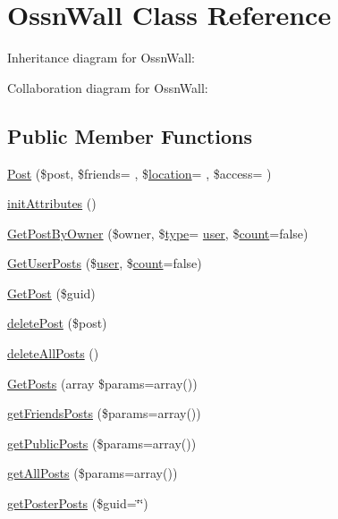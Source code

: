 \hypertarget{class_ossn_wall}{}\section{Ossn\+Wall Class Reference}
\label{class_ossn_wall}


Inheritance diagram for Ossn\+Wall\+:


Collaboration diagram for Ossn\+Wall\+:
\subsection*{Public Member Functions}
\begin{DoxyCompactItemize}
\item 
\hyperlink{class_ossn_wall_aeadb0aa3a5fb5b9d1425567c20942520}{Post} (\$post, \$friends= \textquotesingle{}\textquotesingle{}, \$\hyperlink{_chart_8_doughnut_8js_a761c752fb16f7c0bfe1026b787ca0032}{location}= \textquotesingle{}\textquotesingle{}, \$access= \textquotesingle{}\textquotesingle{})
\item 
\hyperlink{class_ossn_wall_a5fee6794de13185987b790fce43d0883}{init\+Attributes} ()
\item 
\hyperlink{class_ossn_wall_a9f17709243f74afc78d1ae713505d0b3}{Get\+Post\+By\+Owner} (\$owner, \$\hyperlink{_ossn_wall_2actions_2wall_2post_2group_8php_a2dc1bb4e1ed0029daa81ac0776b14b51}{type}= \textquotesingle{}\hyperlink{ossn_8config_8db_8example_8php_a802544b7ba9f79bbf24ef67773d53bed}{user}\textquotesingle{}, \$\hyperlink{photos_2pages_2photos_8php_a364678aa3bd05301b3d1b8650653cf48}{count}=false)
\item 
\hyperlink{class_ossn_wall_a84aad06cd5aff1e1f1001de94047d429}{Get\+User\+Posts} (\$\hyperlink{ossn_8config_8db_8example_8php_a802544b7ba9f79bbf24ef67773d53bed}{user}, \$\hyperlink{photos_2pages_2photos_8php_a364678aa3bd05301b3d1b8650653cf48}{count}=false)
\item 
\hyperlink{class_ossn_wall_a5058502978e1b2f0ed7b0de731092683}{Get\+Post} (\$guid)
\item 
\hyperlink{class_ossn_wall_a8f736af6fb63fc982d04aa10025517f2}{delete\+Post} (\$post)
\item 
\hyperlink{class_ossn_wall_af31442c809884a2acb25802f88dfed26}{delete\+All\+Posts} ()
\item 
\hyperlink{class_ossn_wall_a1dd557d1847bc067d0b91a62821fc8d2}{Get\+Posts} (array \$params=array())
\item 
\hyperlink{class_ossn_wall_a5a4de51f95bf3d107b00ea718ceed53e}{get\+Friends\+Posts} (\$params=array())
\item 
\hyperlink{class_ossn_wall_ad58827706ce79ed3dec2fa93802f8636}{get\+Public\+Posts} (\$params=array())
\item 
\hyperlink{class_ossn_wall_ad4cedacd8cd95b4b942eb9e756795a76}{get\+All\+Posts} (\$params=array())
\item 
\hyperlink{class_ossn_wall_a89cc3aad74f1440e1dd0eedbae07edf6}{get\+Poster\+Posts} (\$guid=\char`\"{}\char`\"{})
\end{DoxyCompactItemize}
